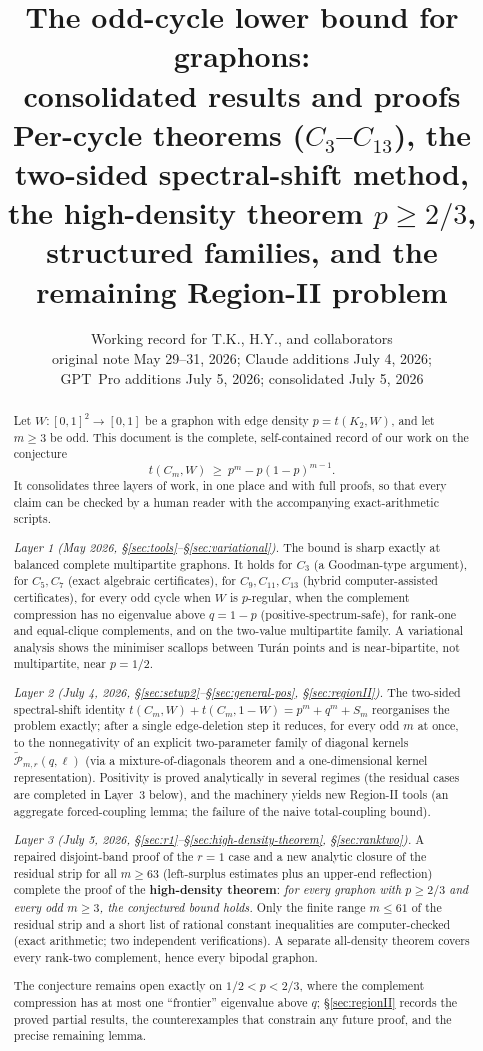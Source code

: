 \documentclass[11pt]{article}
\title{The odd-cycle lower bound for graphons:\\ consolidated results and proofs\\[1mm]
\large Per-cycle theorems ($C_3$--$C_{13}$), the two-sided spectral-shift method,\\ the high-density theorem $p\ge2/3$, structured families, and the remaining Region-II problem}
\author{Working record for T.K., H.Y., and collaborators\\[1mm]
\normalsize original note May 29--31, 2026; Claude additions July 4, 2026;\\
\normalsize GPT~Pro additions July 5, 2026; consolidated July 5, 2026}
\date{}
\newcommand{\wtP}{\widetilde{\mathcal P}}
\begin{document}
\maketitle

\begin{abstract}
Let $W:[0,1]^2\to[0,1]$ be a graphon with edge density $p=t(K_2,W)$, and let $m\ge3$ be odd.  This document is the complete, self-contained record of our work on the conjecture
\[
        t(C_m,W)\ \ge\ p^m-p(1-p)^{m-1}.
\]
It consolidates three layers of work, in one place and with full proofs, so that every claim can be checked by a human reader with the accompanying exact-arithmetic scripts.

\emph{Layer 1 (May 2026, \S\ref{sec:tools}--\S\ref{sec:variational}).}  The bound is sharp exactly at balanced complete multipartite graphons.  It holds for $C_3$ (a Goodman-type argument), for $C_5,C_7$ (exact algebraic certificates), for $C_9,C_{11},C_{13}$ (hybrid computer-assisted certificates), for every odd cycle when $W$ is $p$-regular, when the complement compression has no eigenvalue above $q=1-p$ (positive-spectrum-safe), for rank-one and equal-clique complements, and on the two-value multipartite family.  A variational analysis shows the minimiser scallops between Tur\'an points and is near-bipartite, not multipartite, near $p=1/2$.

\emph{Layer 2 (July 4, 2026, \S\ref{sec:setup2}--\S\ref{sec:general-pos}, \S\ref{sec:regionII}).}  The two-sided spectral-shift identity $t(C_m,W)+t(C_m,1-W)=p^m+q^m+S_m$ reorganises the problem exactly; after a single edge-deletion step it reduces, for every odd $m$ at once, to the nonnegativity of an explicit two-parameter family of diagonal kernels $\wtP_{m,r}(q,\ell)$ (via a mixture-of-diagonals theorem and a one-dimensional kernel representation).  Positivity is proved analytically in several regimes (the residual cases are completed in Layer~3 below), and the machinery yields new Region-II tools (an aggregate forced-coupling lemma; the failure of the naive total-coupling bound).

\emph{Layer 3 (July 5, 2026, \S\ref{sec:r1}--\S\ref{sec:high-density-theorem}, \S\ref{sec:ranktwo}).}  A repaired disjoint-band proof of the $r=1$ case and a new analytic closure of the residual strip for all $m\ge63$ (left-surplus estimates plus an upper-end reflection) complete the proof of the \textbf{high-density theorem}: \emph{for every graphon with $p\ge2/3$ and every odd $m\ge3$, the conjectured bound holds.}  Only the finite range $m\le61$ of the residual strip and a short list of rational constant inequalities are computer-checked (exact arithmetic; two independent verifications).  A separate all-density theorem covers every rank-two complement, hence every bipodal graphon.

The conjecture remains open exactly on $1/2<p<2/3$, where the complement compression has at most one ``frontier'' eigenvalue above $q$; \S\ref{sec:regionII} records the proved partial results, the counterexamples that constrain any future proof, and the precise remaining lemma.
\end{abstract}
\end{document}
